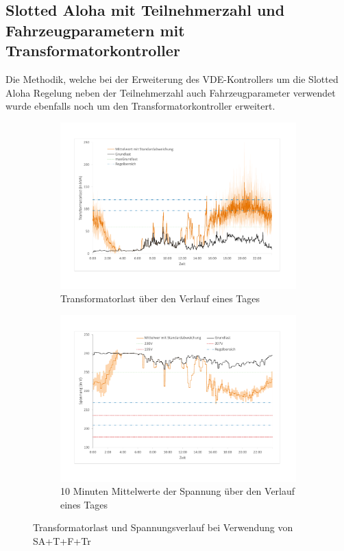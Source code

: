 \subsection{Slotted Aloha mit Teilnehmerzahl und Fahrzeugparametern mit Transformatorkontroller}
\label{chap_SAwtT}
Die Methodik, welche bei der Erweiterung des VDE-Kontrollers um die Slotted Aloha Regelung neben der Teilnehmerzahl auch Fahrzeugparameter verwendet wurde ebenfalls noch um den Transformatorkontroller erweitert.
\begin{figure}
	\begin{subfigure}{\linewidth}
		\includegraphics[scale=0.45]{img/SA_wT_trafo/TrafoLast2.pdf}
		\caption{Transformatorlast über den Verlauf eines Tages}
		\label{Abb_SAwtTrafo_TrafoLast}
	\end{subfigure}
	\begin{subfigure}{\linewidth}
		\includegraphics[scale=0.45]{img/SA_wT_trafo/Spannung2.pdf}
		\caption{10 Minuten Mittelwerte der Spannung über den Verlauf eines Tages}
		\label{Abb_SAwtTrafo_Spannung}
	\end{subfigure}
	\caption{Transformatorlast und Spannungsverlauf bei Verwendung von SA+T+F+Tr}
\end{figure}

